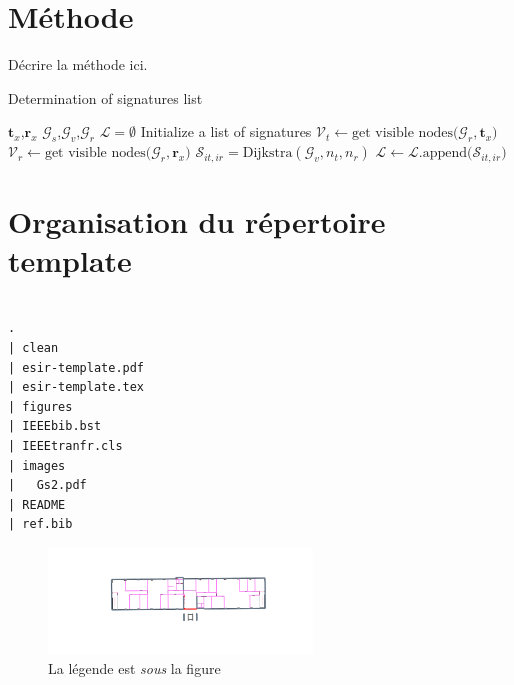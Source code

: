 \documentclass[twocolumn,a4paper]{IEEEtranfr}
\newcommand{\mc}[1]{\mathcal{#1}}
\begin{document}
\section{Méthode}

Décrire la méthode ici.



\begin{algorithm}                      %
\label{alg1}                           %
\caption{Determination of signatures list}
\begin{algorithmic}                    %
\REQUIRE $\mathbf{t}_x$,$\mathbf{r}_x$
\REQUIRE $\mc{G}_s$,$\mc{G}_v$,$\mc{G}_r$
\STATE $\mathcal{L} = \emptyset $ Initialize a list of signatures
\STATE $\mathcal{V}_t \leftarrow \textrm{get visible nodes(}\mc{G}_r,\mathbf{t}_x\textrm{)}$
\STATE $\mathcal{V}_r \leftarrow \textrm{get visible nodes(}\mc{G}_r,\mathbf{r}_x\textrm{)}$
\STATE $\mc{S}_{it,ir}  = \textrm{Dijkstra}(\mc{G}_v,n_t,n_r)$
\STATE $\mathcal{L}\leftarrow \mathcal{L}.\textrm{append(}\mc{S}_{it,ir}\textrm{)}$
\ENDFOR
\ENDFOR
\end{algorithmic}
\end{algorithm}
\section{Organisation du répertoire template}

\begin{verbatim}

.
| clean
| esir-template.pdf
| esir-template.tex
| figures
| IEEEbib.bst
| IEEEtranfr.cls
| images
|   Gs2.pdf
| README
| ref.bib

\end{verbatim}

\begin{figure}[htbp]
\begin{centering}
\par
\includegraphics[width=7cm]{Gs2.pdf}
\caption{La légende est \emph{sous} la figure}
\end{centering}
\end{figure}
%
\end{document}
